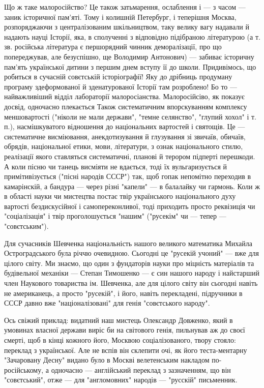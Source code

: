 Що ж таке малоросійство? Це також затьмарення, ослаблення і — з часом — заник
історичної пам'яті. Тому і колишній Петербург, і теперішня Москва,
розпоряджаючи з централізованим шкільництвом, таку велику вагу надавали й
надають науці Історії, яка, в сполученні з відповідно підібраною літературою (а
т. зв. російська література є першорядний чинник деморалізації, про що
попереджував, але безуспішно, ще Володимир Антонович) — забиває історичну
пам'ять української дитини з першим днем вступу її до школи. Придивімось, що
робиться в сучасній совєтській історіографії! Яку до дрібниць продуману
програму здеформованої й зденатурованої Історії там розроблено! Бо то —
найважливіший відділ лабораторії малоросіанства. Малоросійсіво, як показує
досвід, одночасно плекається Також систематичним впорскуванням комплексу
меншовартості ("ніколи не мали держави", "темне селянство", "глупий хохол" і т.
п.), насмішкуватого відношення до національних вартостей і святощів. Це —
систематичне висміювання, анекдотизування й глузування зі звичаїв, обичаїв,
обрядів, національної етики, мови, літератури, з ознак національного стилю,
реалізації якого ставляться систематичні, планові й терором підперті перешкоди.
А коли пісню чи танець висміяти не вдається, тоді їх вульгаризується й
примітивізується ("пісні народів СССР") так, щоб гопак непомітно переходив в
камарінскій, а бандура — через різні "капели" — в балалайку чи гармонь. Коли ж
в області науки чи мистецтва постає твір українського національного духу
вартості бездискусійної і самопереконливої, тоді приходить просто реквізиція чи
"соціалізація" і твір проголошується "нашим" ("русекім" чи — тепер —
"совєтським").

Для сучасників Шевченка національність нашого великого математика Михайла
Остроградського була річчю очевидною. Сьогодні це "русекій учоний" — вже для
цілого світу. Ми знаємо, що один з фундаторів науки про міцність матеріалів та
будівельної механіки — Степан Тимошенко — є син нашого народу і найстарший член
Наукового товариства ім. Шевченка, але для цілого світу він сьогодні навіть не
американець, а просто "русекій", і його, навіть перекладені, підручники в СССР
давно вже "націоналізовані" для генія "совєтського народу".

Ось свіжий приклад: видатний наш мистець Олександр Довженко, який в умовинах
власної держави виріс би на світового генія, пильнував аж до своєї смерті, щоб
в кінці кожного його, Москвою соціалізованого, твору стояло: переклад з
української. Але не вспів він склепити очі, як його теста-ментарну "Зачаровану
Десну" видано було в Москві велетенським накладом по-російському, а одночасно —
англійський переклад з зазначенням, що він "совєтський", отже — для
"англомовних" народів — "русскій" письменник.


